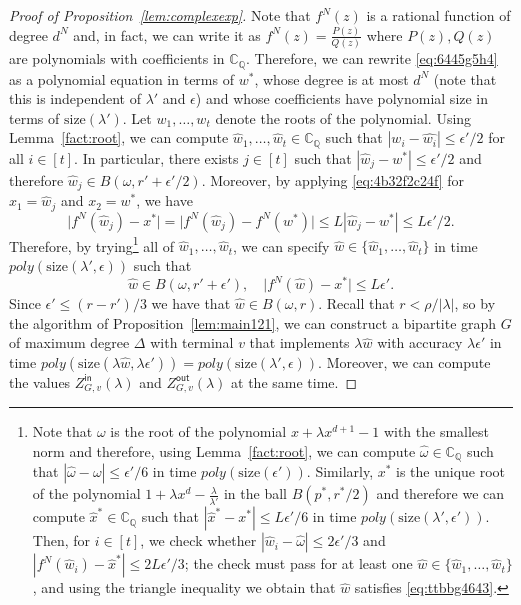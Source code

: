 \documentclass[11pt]{article}
\def\Zin{Z^{\mathsf{in}}}
\def\Zout{Z^{\mathsf{out}}}
\def\CQ{\mathbb{C}_{\mathbb{Q}}}
\newcommand{\size}[1]{\mathrm{size}(#1)}
\newcommand{\fn}[2]{#1^{#2}}
\begin{document}
\begin{proof}[Proof of Proposition~\ref{lem:complexexp}]
Note that $\fn{f}{N}(z)$ is a rational function of degree $d^N$ and, in fact, we can write it as  $\fn{f}{N}(z)=\frac{P(z)}{Q(z)}$ where $P(z),Q(z)$ are polynomials with coefficients in $\CQ$. Therefore,  we can rewrite \eqref{eq:6445g5h4} as a polynomial equation in terms of $w^*$, whose degree is at most $d^N$ (note that this is independent of $\lambda'$ and
$\epsilon$)  and whose coefficients have polynomial size in terms of $\size{\lambda'}$. Let $w_1,\hdots, w_t$ denote the roots of the polynomial. Using Lemma~\ref{fact:root}, we can compute $\hat{w}_1,\hdots, \hat{w}_t\in \CQ$ such that $|w_i-\hat{w_i}|\leq \epsilon'/2$  for all $i\in [t]$. In particular,  there exists $j\in [t]$ such that $|\hat{w}_j-w^*|\leq \epsilon'/2$ and therefore $\hat{w}_j\in B(\omega,r'+\epsilon'/2)$. Moreover, by applying \eqref{eq:4b32f2c24f} for $x_1=\hat{w}_j$ and $x_2=w^*$, we have
\[\big|\fn{f}{N}(\hat{w}_j)-x^*\big|=\big|\fn{f}{N}(\hat{w}_j)-\fn{f}{N}(w^*)\big|\leq L|\hat{w}_j-w^*|\leq L\epsilon'/2.\]
Therefore, by trying\footnote{Note that $\omega$ is the root of the polynomial $x+\lambda x^{d+1}-1$ with the smallest norm and therefore, using Lemma~\ref{fact:root}, we can compute $\hat{\omega}\in \CQ$ such that $|\hat{\omega}-\omega|\leq \epsilon'/6$  in time $poly(\size{\epsilon'})$. Similarly, $x^*$ is the unique root of the polynomial $1+\lambda x^{d}-\frac{\lambda}{\lambda'}$ in the ball $B(p^*,r^*/2)$ and therefore we can compute $\hat{x}^*\in \CQ$ such that $|\hat{x}^*-x^*|\leq L\epsilon'/6$  in time $poly(\size{\lambda',\epsilon'})$. Then, for $i\in[t]$, we check whether $|\hat{w}_i-\hat{\omega}|\leq 2\epsilon'/3$ and $|\fn{f}{N}(\hat{w}_i)-\hat{x}^*|\leq 2L\epsilon'/3$; the check must pass for at least one $\hat{w}\in\{\hat{w}_1,\hdots,\hat{w}_t\}$,  and using the triangle inequality we obtain that $\hat{w}$ satisfies \eqref{eq:ttbbg4643}. }  all of $\hat{w}_1,\hdots, \hat{w}_t$, we can specify $\hat{w}\in \{\hat{w}_1,\hdots, \hat{w}_t\}$ in time $poly(\size{\lambda',\epsilon})$  such that
\begin{equation}\label{eq:ttbbg4643}
\hat{w}\in B(\omega,r'+\epsilon'), \quad \big|\fn{f}{N}(\hat{w})-x^*\big|\leq L\epsilon'.
\end{equation}
Since $\epsilon'\leq (r-r')/3$ we have that $\hat{w}\in B(\omega,r)$. Recall that $r<\rho/|\lambda|$, so by the algorithm of  Proposition~\ref{lem:main121}, we can construct a bipartite graph $G$ of maximum degree $\Delta$ with terminal $v$ that  implements $\lambda \hat{w}$ with accuracy $\lambda \epsilon'$ in time $poly(\size{\lambda \hat{w},\lambda\epsilon'})=poly(\size{\lambda',\epsilon})$. Moreover, we can compute the values $\Zin_{G,v}(\lambda)$ and $\Zout_{G,v}(\lambda)$ at the same time.  


\end{proof}
\end{document}
